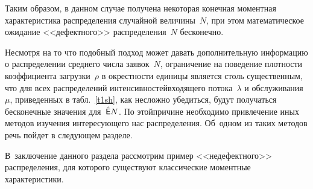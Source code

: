 \begin{multicols}{2}
Таким образом, в данном случае получена некоторая конечная моментная характеристика распределения случайной величины~$N$, 
при этом математическое ожидание <<дефектного>> распределения~$N$ бесконечно.

Несмотря на то что подобный подход может давать дополнительную
информацию о распределении среднего числа заявок~$N$, ограничение на
поведение плотности коэффициента загрузки~$\rho$ в окрестности
единицы является столь существенным, что для всех распределений
интенсивностей\linebreak входящего потока~$\lambda$ и обслуживания~$\mu$,
приведенных в табл.~\ref{t1sh}, как несложно убедиться, будут получаться
бесконечные значения для~$\hat{\sf E}N$. По этой\linebreak причине
необходимо привлечение иных методов изучения интересующего нас
распределения. Об~одном из таких методов речь пойдет в сле\-ду\-ющем
разделе.

В~заключение данного раздела рассмотрим пример <<недефектного>> распределения, для которого существуют классические
моментные характеристики.

\begin{table*}[b]\small
\begin{center}
\vspace*{2ex}


\end{center}
\end{table*}
\end{multicols}
